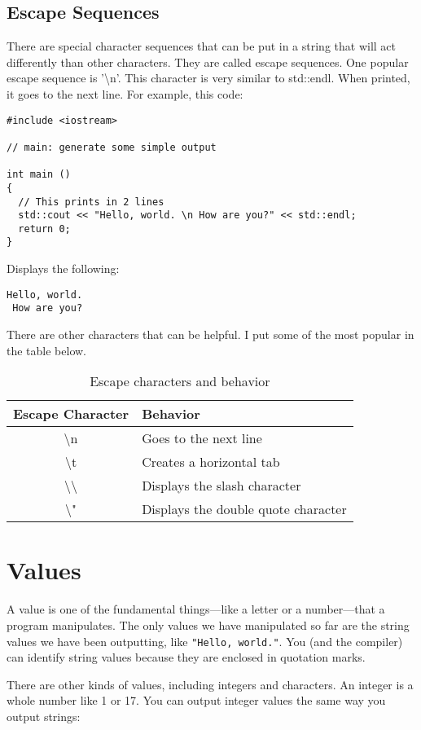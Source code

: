 \subsection{Escape Sequences}
There are special character sequences that can be put in a string
that will act differently than other characters. They are called
escape sequences. One popular escape sequence is '\textbackslash n'. This character
is very similar to std::endl. When printed, it goes to the next line.
For example, this code:
\begin{lstlisting}
#include <iostream>

// main: generate some simple output

int main ()
{
  // This prints in 2 lines
  std::cout << "Hello, world. \n How are you?" << std::endl;  
  return 0;
}
\end{lstlisting}
Displays the following:
\begin{verbatim}
Hello, world.
 How are you?
\end{verbatim}
There are other characters that can be helpful. I put some of the most
popular in the table below.
\begin{table}[h]
\centering
\begin{tabular}{ | c | l | }
\hline
 Escape Character & Behavior \\\hline
 \textbackslash n & Goes to the next line \\ 
 \textbackslash t & Creates a horizontal tab \\  
 \textbackslash\textbackslash &  Displays the slash character \\
 \textbackslash" & Displays the double quote character \\
\hline
\end{tabular}
    \caption{Escape characters and behavior}
    \label{tab:escapechar}
\end{table}
\section{Values}

A value is one of the fundamental things---like a letter or
a number---that a program manipulates.  The only values we have
manipulated so far are the string values we have been outputting, like
{\tt "Hello, world."}.  You (and the compiler) can identify
string values because they are enclosed in quotation marks.

There are other kinds of values, including integers and characters.
An integer is a whole number like 1 or 17.  You can output
integer values the same way you output strings:

